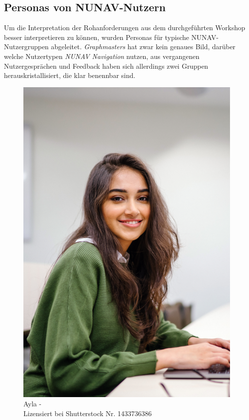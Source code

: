 \subsection{Personas von NUNAV-Nutzern}
\label{sec:06_model_evaluation:personas}

Um die Interpretation der Rohanforderungen aus dem durchgeführten Workshop besser interpretieren zu können, wurden Personas für typische NUNAV-Nutzergruppen abgeleitet. \textit{Graphmasters} hat zwar kein genaues Bild, darüber welche Nutzertypen \textit{NUNAV Navigation} nutzen, aus vergangenen Nutzergesprächen und Feedback haben sich allerdings zwei Gruppen herauskristallisiert, die klar benennbar sind.

\begin{figure}
    \vspace{-\intextsep}
    \centering
    \includegraphics[width=\textwidth]{contents/06_model_evaluation/01_integration/res/persona_picture_ayla.png}
    \caption{Ayla -\\Lizensiert bei Shutterstock Nr. 1433736386}
\end{figure}

